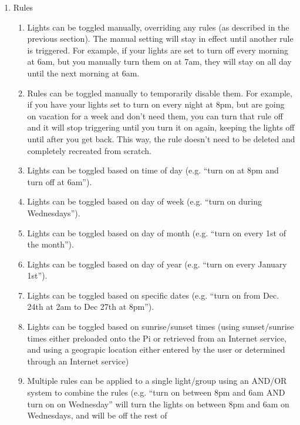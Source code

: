 \documentclass[12pt]{article}
\begin{document}
\begin{enumerate}
    \item Rules
        \begin{enumerate}
            \item Lights can be toggled manually, overriding any rules (as
                described in the previous section). The manual setting will
                stay in effect until another rule is triggered. For example, if
                your lights are set to turn off every morning at 6am, but you
                manually turn them on at 7am, they will stay on all day until
                the next morning at 6am.
            \item Rules can be toggled manually to temporarily disable them.
                For example, if you have your lights set to turn on every night
                at 8pm, but are going on vacation for a week and don't need
                them, you can turn that rule off and it will stop triggering
                until you turn it on again, keeping the lights off until after
                you get back. This way, the rule doesn't need to be deleted and
                completely recreated from scratch.
            \item Lights can be toggled based on time of day (e.g. ``turn on at
                8pm and turn off at 6am'').
            \item Lights can be toggled based on day of week (e.g. ``turn on
                during Wednesdays'').
            \item Lights can be toggled based on day of month (e.g. ``turn on
                every 1st of the month'').
            \item Lights can be toggled based on day of year (e.g. ``turn on
                every January 1st'').
            \item Lights can be toggled based on specific dates (e.g. ``turn on
                from Dec. 24th at 2am to Dec 27th at 8pm'').
            \item Lights can be toggled based on sunrise/sunset times (using
                sunset/sunrise times either preloaded onto the Pi or retrieved
                from an Internet service, and using a geograpic location either
                entered by the user or determined through an Internet service)
            \item Multiple rules can be applied to a single light/group using
                an AND/OR system to combine the rules (e.g. ``turn on between
                8pm and 6am AND turn on on Wednesday'' will turn the lights on
                between 8pm and 6am on Wednesdays, and will be off the rest of

\end{enumerate}
\end{enumerate}
\end{document}

